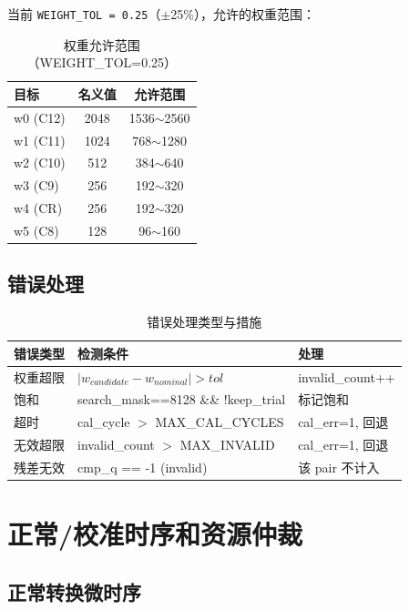 \documentclass[UTF8,a4paper,11pt]{ctexart}
\begin{document}
当前 \texttt{WEIGHT\_TOL = 0.25}（$\pm$25\%），允许的权重范围：

\begin{table}[H]
\centering
\caption{权重允许范围（WEIGHT\_TOL=0.25）}
\label{tab:weight-range}
\begin{tabular}{lcc}
\toprule
目标 & 名义值 & 允许范围 \\
\midrule
w0 (C12) & 2048 & 1536$\sim$2560 \\
w1 (C11) & 1024 & 768$\sim$1280  \\
w2 (C10) & 512  & 384$\sim$640   \\
w3 (C9)  & 256  & 192$\sim$320   \\
w4 (CR)  & 256  & 192$\sim$320   \\
w5 (C8)  & 128  & 96$\sim$160    \\
\bottomrule
\end{tabular}
\end{table}

\subsection{错误处理}

\begin{table}[H]
\centering
\caption{错误处理类型与措施}
\label{tab:error-handling}
\begin{tabular}{lll}
\toprule
错误类型 & 检测条件 & 处理 \\
\midrule
权重超限   & $|w_{candidate} - w_{nominal}| > tol$ & invalid\_count++ \\
饱和       & search\_mask==8128 \&\& !keep\_trial  & 标记饱和 \\
超时       & cal\_cycle $>$ MAX\_CAL\_CYCLES       & cal\_err=1, 回退 \\
无效超限   & invalid\_count $>$ MAX\_INVALID       & cal\_err=1, 回退 \\
残差无效   & cmp\_q == -1 (invalid)                & 该 pair 不计入 \\
\bottomrule
\end{tabular}
\end{table}

\section{正常/校准时序和资源仲裁}

\subsection{正常转换微时序}
\end{document}
